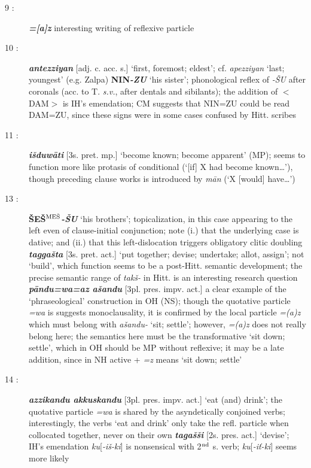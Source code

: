 \documentclass[10pt]{article}
\newcommand{\supersc}[1]{$^{\textrm{\scriptsize{#1}}}$}  	%
\newcommand{\bit}[1]{\textbf{\textit{#1}}}				%
\newcommand{\p}[1]{{\tiny[{#1}]}}					%
\newcommand{\hith}{\textsubwedge{h}}
\newcommand{\mpl}{\supersc{ME\v{S}}}
\renewcommand{\.}[1]{\textsubdot{#1}}
\begin{document}
\begin{description}
\item[9 :] \bit{=[a]z} interesting writing of reflexive particle 

\item[10 :] \bit{{\hith}antezziyan} \p{adj. c. acc. s.} `first, foremost; eldest'; cf. \textit{apezziyan} `last; youngest' (e.g. Zalpa) \textbf{NIN}\bit{-ZU} `his sister'; phonological reflex of \textit{-\v{S}U} after coronals (acc. to T. \textit{s.v.}, after dentals and sibilants); the addition of $<$DAM$>$ is IH's emendation; CM suggests that NIN=ZU could be read DAM=ZU, since these signs were in some cases confused by Hitt. scribes

\item[11 :] \bit{i\v{s}duw\=ati} \p{3s. pret. mp.} `become known; become apparent' (MP); seems to function more like protasis of conditional (`[if] X had become known{\ldots}'), though preceding clause works is introduced by \textit{m\=an} (`X [would] have{\ldots}')

\item[13 :] \textbf{\v{S}E\v{S}{\mpl}}\bit{-\v{S}U} `his brothers'; topicalization, in this case appearing to the left even of clause-initial conjunction; note (i.) that the underlying case is dative; and (ii.) that this left-dislocation triggers obligatory clitic doubling \bit{tagga\v{s}ta} \p{3s. pret. act.} `put together; devise; undertake; allot, assign'; not `build', which function seems to be a post-Hitt. semantic development; the precise semantic range of \textit{tak\v{s}-} in Hitt. is an interesting research question  \bit{p\=andu=wa=az a\v{s}andu} \p{3pl. pres. impv. act.} a clear example of the `phraseological' construction  in OH (NS); though the quotative particle \textit{=wa} is suggests monoclausality, it is confirmed by the local particle \textit{=(a)z} which must belong with \textit{a\v{s}andu-} `sit; settle'; however, \textit{=(a)z} does not really belong here; the semantics here must be the transformative `sit down; settle', which in OH should be MP without reflexive; it may be a late addition, since in NH active + \textit{=z} means `sit down; settle'

\item[14 :] \bit{azzikandu akkuskandu} \p{3pl. pres. impv. act.} `eat (and) drink'; the quotative particle \textit{=wa} is shared by the asyndetically conjoined verbs; interestingly, the verbs `eat and drink' only take the refl. particle when collocated together, never on their own \bit{taga\v{s}\v{s}i} \p{2s. pres. act.} `devise'; IH's emendation \textit{ku}[\textit{-i\v{s}-ki}] is nonsensical with 2\supersc{nd} s. verb; \textit{ku}[\textit{-i\v{t}-ki}] seems more likely


\end{description}
\end{document}
